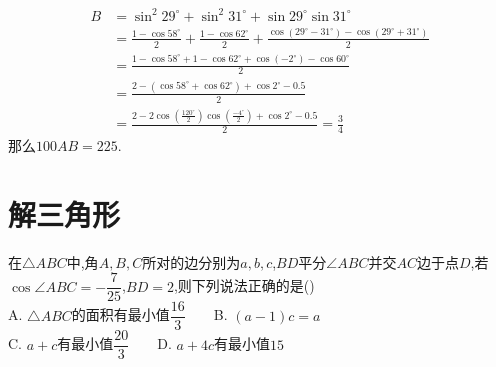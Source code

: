 \documentclass[lang=cn,11pt]{elegantbook}
\begin{document}
\begin{solution}
\begin{align*}
B &= \sin^2 29^\circ + \sin^2 31^\circ + \sin 29^\circ \sin 31^\circ\\
&=\frac{1 - \cos 58^\circ}{2} + \frac{1 - \cos 62^\circ}{2} + \frac{\cos(29^\circ - 31^\circ) - \cos(29^\circ + 31^\circ)}{2}\\
&=\frac{1 - \cos 58^\circ + 1 - \cos 62^\circ + \cos(-2^\circ) - \cos 60^\circ}{2}\\
&= \frac{2 - (\cos 58^\circ + \cos 62^\circ) + \cos 2^\circ - 0.5}{2}\\
&= \frac{2 - 2\cos\left(\frac{120^\circ}{2}\right)\cos\left(\frac{-4^\circ}{2}\right) + \cos 2^\circ - 0.5}{2}=\frac{3}{4}
\end{align*}
那么$100AB=225$.
\end{solution}

\chapter{解三角形}
\begin{exercise}
在$\triangle ABC$中,角$A,B,C$所对的边分别为$a,b,c$,$BD$平分$\angle ABC$并交$AC$边于点$D$,若$\cos\angle ABC=-\dfrac{7}{25}$,$BD=2$,则下列说法正确的是(\quad )\\
A. $\triangle ABC$的面积有最小值$\dfrac{16}{3}$~~~~B. $(a-1)c=a$\\
C. $a+c$有最小值$\dfrac{20}{3}$~~~~D. $a+4c$有最小值$15$
\end{exercise}
\end{document}
